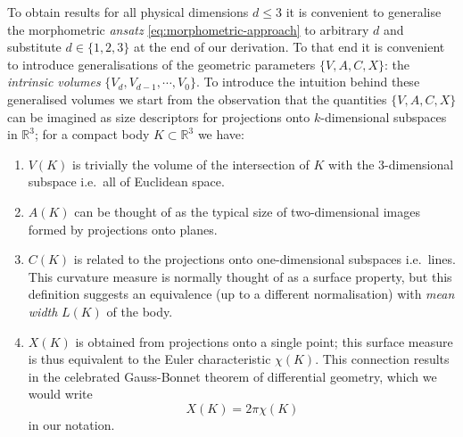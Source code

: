 To obtain results for all physical dimensions $d \le 3$ it is convenient to generalise the morphometric \emph{ansatz} \eqref{eq:morphometric-approach} to arbitrary $d$ and substitute $d \in \{1, 2, 3\}$ at the end of our derivation.
To that end it is convenient to introduce generalisations of the geometric parameters $\{V,A,C,X\}$: the \emph{intrinsic volumes} $\{V_d, V_{d-1}, \cdots, V_0\}$.
To introduce the intuition behind these generalised volumes we start from the observation that the quantities $\{V,A,C,X\}$ can be imagined as size descriptors for projections onto $k$-dimensional subspaces in $\mathbb{R}^3$; for a compact body $K \subset \mathbb{R}^3$ we have:
\begin{enumerate}
\item $V(K)$ is trivially the volume of the intersection of $K$ with the 3-dimensional subspace i.e.\ all of Euclidean space.
\item $A(K)$ can be thought of as the typical size of two-dimensional images formed by projections onto planes.
\item $C(K)$ is related to the projections onto one-dimensional subspaces i.e.\ lines.
  This curvature measure is normally thought of as a surface property, but this definition suggests an equivalence (up to a different normalisation) with \emph{mean width} $L(K)$ of the body.
\item $X(K)$ is obtained from projections onto a single point; this surface measure is thus equivalent to the Euler characteristic $\chi(K)$.
  This connection results in the celebrated Gauss-Bonnet theorem of differential geometry, which we would write
  \begin{equation*}
    X(K) = 2\pi \chi(K)
  \end{equation*}
  in our notation.
\end{enumerate}

